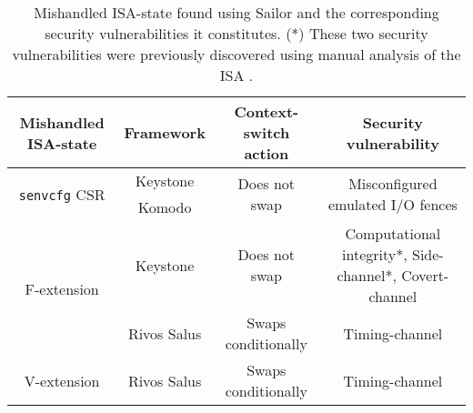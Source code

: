 \begin{table*}[t]
\begin{center}
\begin{tabular}{ | c | c | c | c |} 
  \hline
  Mishandled ISA-state & Framework & Context-switch action & Security vulnerability\\ 
  \hline
  \multirow{2}{*}{\texttt{senvcfg} CSR} & Keystone & \multirow{2}{*}{Does not swap} & \multirow{2}{*}{Misconfigured emulated I/O fences} \\ 
  \cline{2-2} 
   & Komodo & & \\
  \hline 
  \multirow{2}{*}{F-extension} & Keystone & Does not swap & Computational integrity*, Side-channel*, Covert-channel \\ 
  \cline{2-4}
  & Rivos Salus & Swaps conditionally & Timing-channel \\
  \hline 
  V-extension & Rivos Salus & Swaps conditionally & Timing-channel \\
  \hline 
\end{tabular}
\caption{Mishandled ISA-state found using Sailor and the corresponding security vulnerabilities it constitutes. (*) These two security vulnerabilities were previously discovered using manual analysis of the ISA \cite{dtrap-fpu}.}
\label{tab:vuln}
\end{center}
\end{table*}
